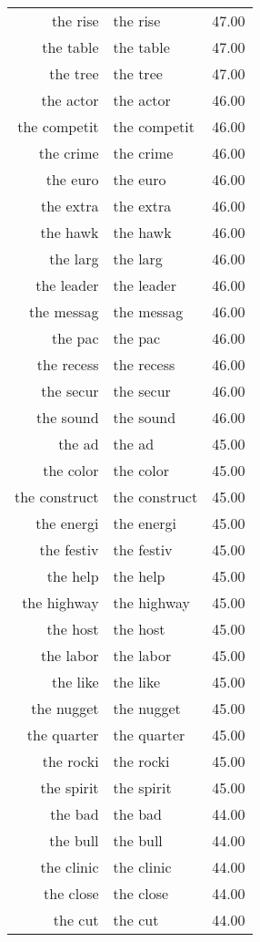 \begin{table}[ht]
\begin{tabular}{rlr}
  the rise & the rise & 47.00 \\ 
  the table & the table & 47.00 \\ 
  the tree & the tree & 47.00 \\ 
  the actor & the actor & 46.00 \\ 
  the competit & the competit & 46.00 \\ 
  the crime & the crime & 46.00 \\ 
  the euro & the euro & 46.00 \\ 
  the extra & the extra & 46.00 \\ 
  the hawk & the hawk & 46.00 \\ 
  the larg & the larg & 46.00 \\ 
  the leader & the leader & 46.00 \\ 
  the messag & the messag & 46.00 \\ 
  the pac & the pac & 46.00 \\ 
  the recess & the recess & 46.00 \\ 
  the secur & the secur & 46.00 \\ 
  the sound & the sound & 46.00 \\ 
  the ad & the ad & 45.00 \\ 
  the color & the color & 45.00 \\ 
  the construct & the construct & 45.00 \\ 
  the energi & the energi & 45.00 \\ 
  the festiv & the festiv & 45.00 \\ 
  the help & the help & 45.00 \\ 
  the highway & the highway & 45.00 \\ 
  the host & the host & 45.00 \\ 
  the labor & the labor & 45.00 \\ 
  the like & the like & 45.00 \\ 
  the nugget & the nugget & 45.00 \\ 
  the quarter & the quarter & 45.00 \\ 
  the rocki & the rocki & 45.00 \\ 
  the spirit & the spirit & 45.00 \\ 
  the bad & the bad & 44.00 \\ 
  the bull & the bull & 44.00 \\ 
  the clinic & the clinic & 44.00 \\ 
  the close & the close & 44.00 \\ 
  the cut & the cut & 44.00 \\ 

\end{tabular}
\end{table}

